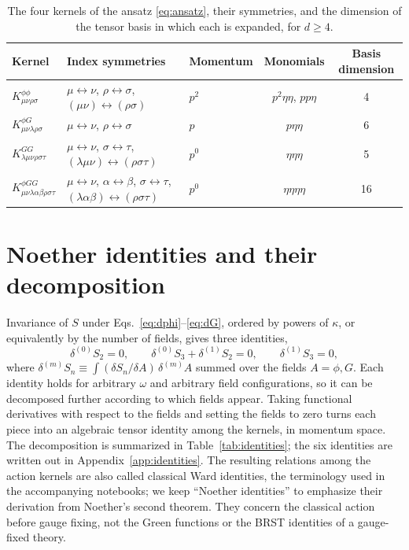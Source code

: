 \documentclass[prd,aps,preprint,superscriptaddress,nofootinbib,amsmath,amssymb,eqsecnum]{revtex4-2}
\begin{document}
\begin{table}[htb]
\centering
\begin{tabular}{@{}lllcc@{}}
\toprule
Kernel & Index symmetries & Momentum & Monomials & Basis dimension \\
\midrule
$K^{\phi\phi}_{\mu\nu\rho\sigma}$ & $\mu\leftrightarrow\nu$, $\rho\leftrightarrow\sigma$, $(\mu\nu)\leftrightarrow(\rho\sigma)$ & $p^2$ & $p^2\eta\eta$, $pp\eta$ & 4 \\
$K^{\phi G}_{\mu\nu\lambda\rho\sigma}$ & $\mu\leftrightarrow\nu$, $\rho\leftrightarrow\sigma$ & $p$ & $p\eta\eta$ & 6 \\
$K^{GG}_{\lambda\mu\nu\rho\sigma\tau}$ & $\mu\leftrightarrow\nu$, $\sigma\leftrightarrow\tau$, $(\lambda\mu\nu)\leftrightarrow(\rho\sigma\tau)$ & $p^0$ & $\eta\eta\eta$ & 5 \\
$K^{\phi GG}_{\mu\nu\lambda\alpha\beta\rho\sigma\tau}$ & $\mu\leftrightarrow\nu$, $\alpha\leftrightarrow\beta$, $\sigma\leftrightarrow\tau$, $(\lambda\alpha\beta)\leftrightarrow(\rho\sigma\tau)$ & $p^0$ & $\eta\eta\eta\eta$ & 16 \\
\bottomrule
\end{tabular}
\caption{The four kernels of the ansatz \eqref{eq:ansatz}, their symmetries, and the
dimension of the tensor basis in which each is expanded, for $d\geq4$.}
\label{tab:kernels}
\end{table}

\section{Noether identities and their decomposition}
\label{sec:identities}

Invariance of $S$ under Eqs.~\eqref{eq:dphi}--\eqref{eq:dG}, ordered by powers of
$\kappa$, or equivalently by the number of fields, gives three identities,
\begin{equation}
\delta^{(0)}S_2=0,\qquad
\delta^{(0)}S_3+\delta^{(1)}S_2=0,\qquad
\delta^{(1)}S_3=0,
\label{eq:noether}
\end{equation}
where $\delta^{(m)}S_n\equiv\int(\delta S_n/\delta A)\,\delta^{(m)}A$ summed over the
fields $A=\phi,G$. Each identity holds for arbitrary $\omega$ and arbitrary field
configurations, so it can be decomposed further according to which fields appear. Taking
functional derivatives with respect to the fields and setting the fields to zero turns each
piece into an algebraic tensor identity among the kernels, in momentum space. The
decomposition is summarized in Table~\ref{tab:identities}; the six identities are written out
in Appendix~\ref{app:identities}. The resulting relations among the action kernels are also
called classical Ward identities, the terminology used in the accompanying notebooks; we
keep ``Noether identities'' to emphasize their derivation from Noether's second theorem.
They concern the classical action before gauge fixing, not the Green functions or the BRST
identities of a gauge-fixed theory.
\end{document}
